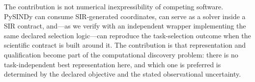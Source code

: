 The contribution is not numerical inexpressibility of competing software.
PySINDy can consume SIR-generated coordinates, can serve as a solver inside a SIR
contract, and---as we verify with an independent wrapper implementing the same
declared selection logic---can reproduce the task-selection outcome when the
scientific contract is built around it. The contribution is that representation
and qualification become part of the computational discovery problem: there is
no task-independent best representation here, and which one is preferred is
determined by the declared objective and the stated observational uncertainty.
